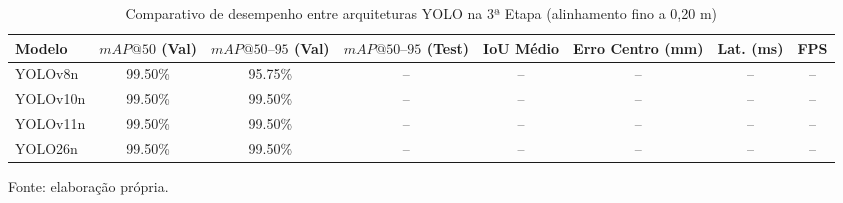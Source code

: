 \begin{table}[H]
    \centering
    \small
    \setlength{\tabcolsep}{4.5pt}
    \captionsetup{justification=centering}
    \caption{Comparativo de desempenho entre arquiteturas YOLO na 3ª Etapa (alinhamento fino a 0,20 m)}
    \label{tab:comparativo_yolo_etapa3_alinhamento}
    \vspace{0.2cm}
    \begin{tabular}{lccccccc}
        \hline
        \textbf{Modelo} & \textbf{$mAP@50$ (Val)} & \textbf{$mAP@50\text{--}95$ (Val)} & \textbf{$mAP@50\text{--}95$ (Test)} & \textbf{IoU Médio} & \textbf{Erro Centro (mm)} & \textbf{Lat. (ms)} & \textbf{FPS} \\
        \hline
        YOLOv8n   & 99.50\%    & 95.75\%    & --         & --         & --         & --       & -- \\
        YOLOv10n  & 99.50\%    & 99.50\%    & --         & --         & --         & --       & -- \\
        YOLOv11n  & 99.50\%    & 99.50\%    & --         & --         & --         & --       & -- \\
        YOLO26n   & 99.50\%    & 99.50\%    & --         & --         & --         & --       & -- \\
        \hline
    \end{tabular}
    \vspace{0.2cm}
    \begin{flushleft}
        \footnotesize Fonte: elaboração própria.
    \end{flushleft}
\end{table}